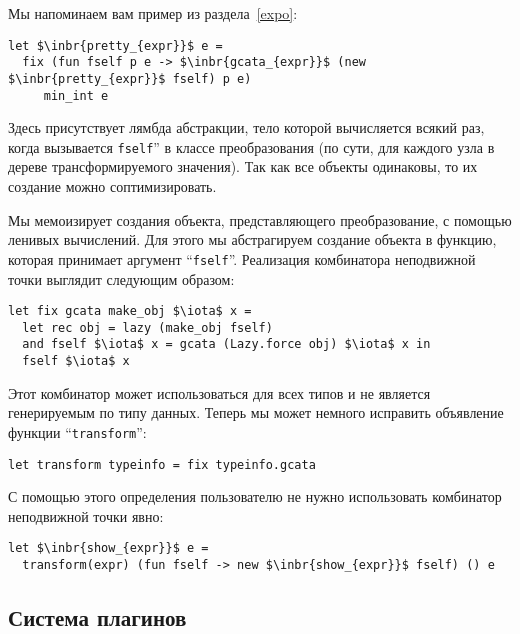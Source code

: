 Мы напоминаем вам пример из раздела~\ref{expo}:

\begin{lstlisting}
let $\inbr{pretty_{expr}}$ e =
  fix (fun fself p e -> $\inbr{gcata_{expr}}$ (new $\inbr{pretty_{expr}}$ fself) p e)     
     min_int e
\end{lstlisting}

Здесь присутствует лямбда абстракции, тело которой вычисляется всякий раз, когда вызывается \lstinline{fself}'' в классе преобразования (по сути, для каждого узла в дереве трансформируемого значения). Так как все объекты одинаковы, то их создание можно соптимизировать.

Мы мемоизирует создания объекта, представляющего преобразование, с помощью ленивых вычислений. Для этого мы абстрагируем создание объекта в функцию, которая принимает
аргумент ``\lstinline{fself}''. Реализация комбинатора неподвижной точки выглядит следующим образом:

\begin{lstlisting}
let fix gcata make_obj $\iota$ x =
  let rec obj = lazy (make_obj fself)
  and fself $\iota$ x = gcata (Lazy.force obj) $\iota$ x in
  fself $\iota$ x
\end{lstlisting}

Этот комбинатор может использоваться для всех типов и не является генерируемым по типу данных. Теперь мы может немного исправить объявление функции ``\lstinline{transform}'':

\begin{lstlisting}
let transform typeinfo = fix typeinfo.gcata
\end{lstlisting}

С помощью этого определения пользователю не нужно использовать комбинатор неподвижной точки явно:

\begin{lstlisting}
let $\inbr{show_{expr}}$ e =
  transform(expr) (fun fself -> new $\inbr{show_{expr}}$ fself) () e
\end{lstlisting}

\subsection{Система плагинов}
\label{plugins}

